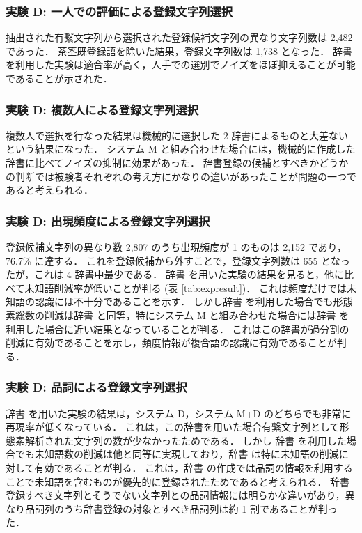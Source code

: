 \subsubsection{実験 D\idl: 一人での評価による登録文字列選択}
\label{sec:didl}
抽出された有繋文字列から選択された登録候補文字列の異なり文字列数は 2,482 であった．
茶筌既登録語を除いた結果，登録文字列数は 1,738 となった．
辞書 \idl を利用した実験は適合率が高く，人手での選別でノイズをほぼ抑えることが可能であることが示された．
\subsubsection{実験 D\chk: 複数人による登録文字列選択}
\label{sec:dchk}
複数人で選択を行なった結果は機械的に選択した 2 辞書によるものと大差ないという結果になった．
システム M と組み合わせた場合には，機械的に作成した辞書に比べてノイズの抑制に効果があった．
辞書登録の候補とすべきかどうかの判断では被験者それぞれの考え方にかなりの違いがあったことが問題の一つであると考えられる．
\subsubsection{実験 D\frq: 出現頻度による登録文字列選択}
\label{sec:dfrq}
登録候補文字列の異なり数 2,807 のうち出現頻度が 1 のものは 2,152 であり， 76.7\% に達する．
これを登録候補から外すことで，登録文字列数は 655 となったが，これは 4 辞書中最少である．
辞書 \frq を用いた実験の結果を見ると，他に比べて未知語削減率が低いことが判る (表 \ref{tab:expresult})．
これは頻度だけでは未知語の認識には不十分であることを示す．
しかし辞書 \frq を利用した場合でも形態素総数の削減は辞書 \chk と同等，特にシステム M と組み合わせた場合には辞書 \idl を利用した場合に近い結果となっていることが判る．
これはこの辞書が過分割の削減に有効であることを示し，頻度情報が複合語の認識に有効であることが判る．
\subsubsection{実験 D\pos: 品詞による登録文字列選択}
\label{sec:dpos}
辞書 \pos を用いた実験の結果は，システム D，システム M+D のどちらでも非常に再現率が低くなっている．
これは，この辞書を用いた場合有繋文字列として形態素解析された文字列の数が少なかったためである．
しかし
辞書 \pos を利用した場合でも未知語数の削減は他と同等に実現しており，辞書 \pos は特に未知語の削減に対して有効であることが判る．
これは，辞書 \pos の作成では品詞の情報を利用することで未知語を含むものが優先的に登録されたためであると考えられる．
辞書登録すべき文字列とそうでない文字列との品詞情報には明らかな違いがあり，異なり品詞列のうち辞書登録の対象とすべき品詞列は約 1 割であることが判った．
